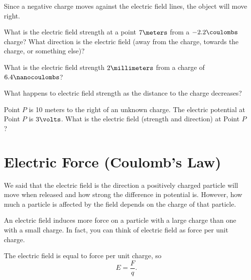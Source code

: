 \documentclass[12pt,paper=letter]{scrartcl}
\begin{document}
    Since a negative charge moves against the electric field lines,
    the object will move right.


    



    \begin{mdframed}[style=exmdbox]
        \begin{problem}
            What is the electric field strength at a point $7\meters$ from a $-2.2\coulombs$ charge?
            What direction is the electric field (away from the charge, towards the charge, or something else)?
        \end{problem}
        \begin{problem}
            What is the electric field strength $2\millimeters$ from a charge of $6.4\nanocoulombs$? \hint{\ref{hint:table_of_conversions}}
        \end{problem}

        \begin{problem}
            What happens to electric field strength as the distance to the charge decreases? \hint{\ref{hint:approximate_limit_electric_field}}
        \end{problem}

        \begin{problem}[Challenge]
            Point $P$ is 10 meters to the right of an unknown charge.
            The electric potential at Point $P$ is $3\volts$.
            What is the electric field (strength and direction) at Point $P$? \hint{\ref{hint:field_challenge_1}}
        \end{problem}

    \end{mdframed}


    \section{Electric Force (Coulomb's Law)}
    We said that the electric field is the direction a positively charged particle will move when released
    and how strong the difference in potential is.
    However, how much a particle is affected by the field depends on the charge of that particle.

    \pnp

    An electric field induces more force on a particle with a large charge than one with a small charge.
    In fact, you can think of electric field as force per unit charge.

    \begin{thmboxed}
        The electric field is equal to force per unit charge,
        so
        \begin{equation}
            E=\frac{F}{q}.
            \label{eq:force_per_unit_charge}
        \end{equation}
    \end{thmboxed}
\end{document}
